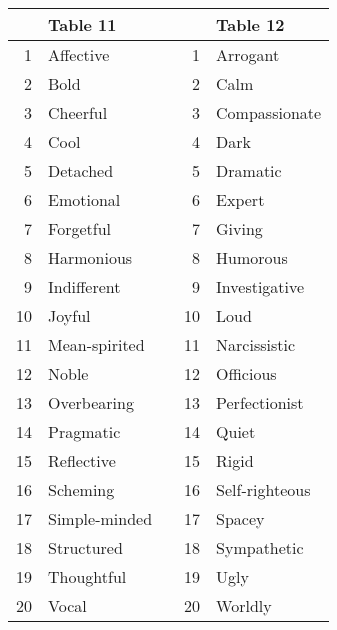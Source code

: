 \documentclass[12pt]{article}
\begin{document}
\begin{tabular}{r|l l r|l}
 & Table 11 & & & Table 12 \\\hline
 1 & Affective & &  1 & Arrogant\\
 2 & Bold & &  2 & Calm\\
 3 & Cheerful & &  3 & Compassionate\\
 4 & Cool & &  4 & Dark\\
 5 & Detached & &  5 & Dramatic\\
 6 & Emotional & &  6 & Expert\\
 7 & Forgetful & &  7 & Giving\\
 8 & Harmonious & &  8 & Humorous\\
 9 & Indifferent & &  9 & Investigative\\
10 & Joyful & & 10 & Loud\\
11 & Mean-spirited & & 11 & Narcissistic\\
12 & Noble & & 12 & Officious\\
13 & Overbearing & & 13 & Perfectionist\\
14 & Pragmatic & & 14 & Quiet\\
15 & Reflective & & 15 & Rigid\\
16 & Scheming & & 16 & Self-righteous\\
17 & Simple-minded & & 17 & Spacey\\
18 & Structured & & 18 & Sympathetic\\
19 & Thoughtful & & 19 & Ugly\\
20 & Vocal & & 20 & Worldly\\
\end{tabular}
\end{document}
